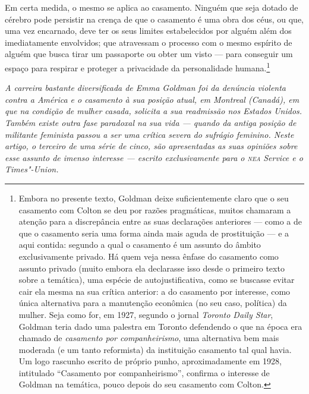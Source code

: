 Em certa medida, o mesmo se aplica ao casamento. Ninguém
que seja dotado de cérebro pode persistir na crença de que o
casamento é uma obra dos céus, ou
que, uma vez encarnado, deve ter os seus limites estabelecidos por alguém além dos imediatamente envolvidos; que atravessam o processo com o mesmo espírito
de alguém que busca tirar um passaporte ou obter um visto --- para
conseguir um espaço para respirar e proteger a privacidade da
personalidade humana.\footnote{Embora no presente texto, Goldman deixe
  suficientemente claro que o seu casamento com Colton se deu por razões
  pragmáticas, muitos chamaram a atenção para a discrepância entre as
  suas declarações anteriores --- como a de que o casamento seria uma forma
  ainda mais aguda de prostituição --- e a aqui contida: segundo a qual o
  casamento é um assunto do âmbito exclusivamente privado. Há quem veja
  nessa ênfase do casamento como assunto privado (muito embora ela declarasse isso desde o  primeiro
  texto sobre a temática), uma espécie de autojustificativa, como se
  buscasse evitar cair ela mesma na sua crítica anterior: a do
  casamento por interesse, como única alternativa para a manutenção
  econômica (no seu caso, política) da mulher. Seja como for, em 1927,
  segundo o jornal \textit{Toronto Daily Star}, Goldman teria dado uma palestra
  em Toronto defendendo o que na época era chamado de \textit{casamento por
  companheirismo}, uma alternativa bem mais moderada (e um tanto
  reformista) da instituição casamento tal qual havia. Um logo rascunho
  escrito de próprio punho, aproximadamente em 1928, intitulado
  ``Casamento por companheirismo'', confirma o interesse de Goldman na
  temática, pouco depois do seu casamento com Colton.}


\textit{A carreira bastante diversificada de Emma Goldman foi da
denúncia violenta contra a América e o casamento à sua posição atual, em
Montreal (Canadá), em que na condição de mulher casada, solicita a sua readmissão nos Estados Unidos. Também existe outra fase paradoxal na sua
vida --- quando da antiga posição de militante feminista passou a ser
uma crítica severa do sufrágio feminino. Neste artigo, o terceiro de uma
série de cinco, são apresentadas as suas opiniões sobre esse assunto de
imenso interesse --- escrito exclusivamente para o \textit{\textsc{nea} Service} e o
\textit{Times"-Union.}}

